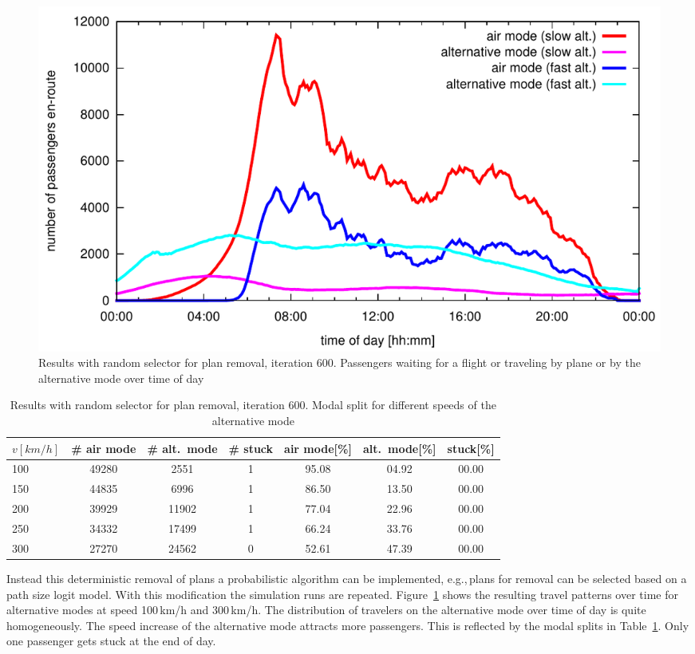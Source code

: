 \begin{figure}[t]
	\centering
	\includegraphics[width=\linewidth]{./extending/figures/air/leg_histogram_improved_flight_train_en_route_1893_1897_it_600.pdf}
	\caption{Results with random selector for plan removal, iteration 600. Passengers waiting for a flight or traveling by plane or by the alternative mode over time of day}
	\label{fig:2009_leg_histogram_modes_psl}
\end{figure}

\begin{table}[t]
	\centering
	\begin{tabular}{@{}l|ccc|ccc@{}}
		$v [km/h]$	& \# air mode  & \# alt.~mode & \# stuck & air mode[\%]  & alt.~mode[\%] & stuck[\%] \\
		\hline 
		100 & 49280 & 2551 & 1 & 95.08 & 04.92 & 00.00\\	%
		150 & 44835 & 6996 & 1 & 86.50 & 13.50 & 00.00\\	%
		200 & 39929 & 11902 & 1 & 77.04 & 22.96 & 00.00\\	%
		250 & 34332 & 17499 & 1 & 66.24 & 33.76 & 00.00\\	%
		300 & 27270 & 24562 & 0 & 52.61 & 47.39 & 00.00\\	%
	\end{tabular}
	\caption{Results with random selector for plan removal, iteration 600. Modal split for different speeds of the alternative mode}
	\label{tab:2009_results_train_modal_split_psl}
\end{table}

Instead this deterministic removal of plans a probabilistic algorithm can be implemented, e.g.,\,plans for removal can be selected based on a path size logit model. 
With this modification the simulation runs are repeated. 
Figure~\ref{fig:2009_leg_histogram_modes_psl} shows the resulting travel patterns over time for alternative modes at speed 100\,km/h and 300\,km/h.  
The distribution of travelers on the alternative mode over time of day is quite homogeneously. 
The speed increase of the alternative mode attracts more passengers. 
This is reflected by the modal splits in Table~\ref{tab:2009_results_train_modal_split_psl}. 
Only one passenger gets stuck at the end of day. 

